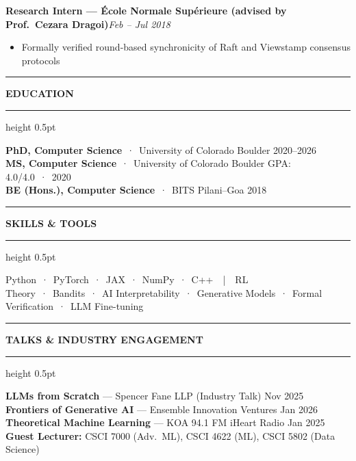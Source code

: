 \documentclass[10.5pt]{article}
\newcommand{\rezsec}[1]{%
  \vspace{8pt}%
  \noindent
  {\color{accent}\rule[-2pt]{2.4pt}{9pt}}%
  \hspace{5pt}%
  {\small\bfseries\color{navy}\MakeUppercase{#1}}%
  \hspace{6pt}%
  {\color{rule}\leaders\hrule height 0.5pt\hfill\kern0pt}%
  \vspace{2pt}\par%
}
\newcommand{\expentry}[2]{%
  {\small\textbf{#1}\hfill\textit{\color{muted}#2}}\par
}
\begin{document}
\vspace{3pt}
\expentry{Research Intern — École Normale Supérieure (advised by Prof.\ Cezara Dragoi)}{Feb – Jul 2018}
\begin{itemize}
  \item Formally verified round-based synchronicity of Raft and Viewstamp consensus protocols
\end{itemize}

\rezsec{Education}
{\small
\textbf{PhD, Computer Science}~·~University of Colorado Boulder \hfill 2020–2026\\[1pt]
\textbf{MS, Computer Science}~·~University of Colorado Boulder \hfill GPA: 4.0/4.0~·~2020\\[1pt]
\textbf{BE (Hons.), Computer Science}~·~BITS Pilani–Goa \hfill 2018
}

\rezsec{Skills \& Tools}
{\small Python~·~PyTorch~·~JAX~·~NumPy~·~C++~~|~~RL Theory~·~Bandits~·~AI Interpretability~·~Generative Models~·~Formal Verification~·~LLM Fine-tuning}

\rezsec{Talks \& Industry Engagement}
{\small
\textbf{LLMs from Scratch} — Spencer Fane LLP (Industry Talk) \hfill Nov 2025\\[1pt]
\textbf{Frontiers of Generative AI} — Ensemble Innovation Ventures \hfill Jan 2026\\[1pt]
\textbf{Theoretical Machine Learning} — KOA 94.1 FM iHeart Radio \hfill Jan 2025\\[1pt]
\textbf{Guest Lecturer:} CSCI 7000 (Adv.\ ML), CSCI 4622 (ML), CSCI 5802 (Data Science)
}
\end{document}
